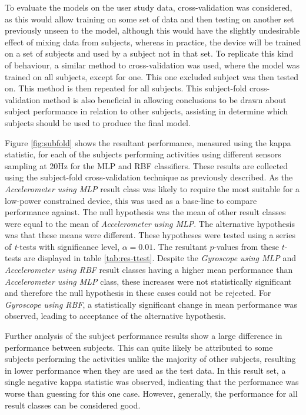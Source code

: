 To evaluate the models on the user study data, cross-validation was considered, as this would allow training on some set of data and then testing on another set previously unseen to the model, although this would have the slightly undesirable effect of mixing data from subjects, whereas in practice, the device will be trained on a set of subjects and used by a subject not in that set. To replicate this kind of behaviour, a similar method to cross-validation was used, where the model was trained on all subjects, except for one. This one excluded subject was then tested on. This method is then repeated for all subjects. This subject-fold cross-validation method is also beneficial in allowing conclusions to be drawn about subject performance in relation to other subjects, assisting in determine which subjects should be used to produce the final model.

Figure \ref{fig:subfold} shows the resultant performance, measured using the kappa statistic, for each of the subjects performing activities using different sensors sampling at 20Hz for the MLP and RBF classifiers. These results are collected using the subject-fold cross-validation technique as previously described. As the \textit{Accelerometer using MLP} result class was likely to require the most suitable for a low-power constrained device, this was used as a base-line to compare performance against. The null hypothesis was the mean of other result classes were equal to the mean of \textit{Accelerometer using MLP}. The alternative hypothesis was that these means were different. These hypotheses were tested using a series of \textit{t}-tests with significance level, $\alpha = 0.01$. The resultant $p$-values from these $t$-tests are displayed in table \ref{tab:res-ttest}. Despite the \textit{Gyroscope using MLP} and \textit{Accelerometer using RBF} result classes having a higher mean performance than \textit{Accelerometer using MLP} class, these increases were not statistically significant and therefore the null hypothesis in these cases could not be rejected. For \textit{Gyroscope using RBF}, a statistically significant change in mean performance was observed, leading to acceptance of the alternative hypothesis.

Further analysis of the subject performance results show a large difference in performance between subjects. This can quite likely be attributed to some subjects performing the activities unlike the majority of other subjects, resulting in lower performance when they are used as the test data. In this result set, a single negative kappa statistic was observed, indicating that the performance was worse than guessing for this one case. However, generally, the performance for all result classes can be considered good.


